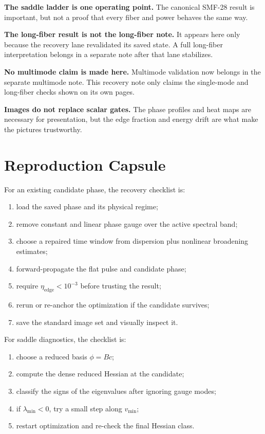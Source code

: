 \documentclass[11pt]{article}
\begin{document}
\textbf{The saddle ladder is one operating point.} The canonical SMF-28 result
is important, but not a proof that every fiber and power behaves the same way.

\textbf{The long-fiber result is not the long-fiber note.} It appears here only
because the recovery lane revalidated its saved state. A full long-fiber
interpretation belongs in a separate note after that lane stabilizes.

\textbf{No multimode claim is made here.} Multimode validation now belongs in
the separate multimode note. This recovery note only claims the single-mode
and long-fiber checks shown on its own pages.

\textbf{Images do not replace scalar gates.} The phase profiles and heat maps
are necessary for presentation, but the edge fraction and energy drift are what
make the pictures trustworthy.

\section{Reproduction Capsule}

For an existing candidate phase, the recovery checklist is:
\begin{enumerate}
    \item load the saved phase and its physical regime;
    \item remove constant and linear phase gauge over the active spectral band;
    \item choose a repaired time window from dispersion plus nonlinear
    broadening estimates;
    \item forward-propagate the flat pulse and candidate phase;
    \item require \(\eta_{\mathrm{edge}}<10^{-3}\) before trusting the result;
    \item rerun or re-anchor the optimization if the candidate survives;
    \item save the standard image set and visually inspect it.
\end{enumerate}

For saddle diagnostics, the checklist is:
\begin{enumerate}
    \item choose a reduced basis \(\phi=Bc\);
    \item compute the dense reduced Hessian at the candidate;
    \item classify the signs of the eigenvalues after ignoring gauge modes;
    \item if \(\lambda_{\min}<0\), try a small step along \(v_{\min}\);
    \item restart optimization and re-check the final Hessian class.
\end{enumerate}
\end{document}
